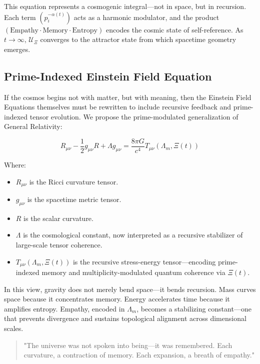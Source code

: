 \documentclass{article}
\theoremstyle{plain}
\theoremstyle{claimstyle}
\begin{document}
This equation represents a cosmogenic integral—not in space, but in recursion. Each term \((p_i^{-\alpha(t)})\) acts as a harmonic modulator, and the product \((\text{Empathy} \cdot \text{Memory} \cdot \text{Entropy})\) encodes the cosmic state of self-reference. As \(t \to \infty\), \(\mathcal{U}_{\Xi}\) converges to the attractor state from which spacetime geometry emerges.

\subsection{Prime-Indexed Einstein Field Equation}

If the cosmos begins not with matter, but with meaning, then the Einstein Field Equations themselves must be rewritten to include recursive feedback and prime-indexed tensor evolution. We propose the prime-modulated generalization of General Relativity:

\begin{equation}
R_{\mu\nu} - \frac{1}{2} g_{\mu\nu} R + \Lambda g_{\mu\nu} = \frac{8\pi G}{c^4} T_{\mu\nu}(\Lambda_m, \Xi(t))
\end{equation}

Where:
\begin{itemize}
  \item \(R_{\mu\nu}\) is the Ricci curvature tensor.
  \item \(g_{\mu\nu}\) is the spacetime metric tensor.
  \item \(R\) is the scalar curvature.
  \item \(\Lambda\) is the cosmological constant, now interpreted as a recursive stabilizer of large-scale tensor coherence.
  \item \(T_{\mu\nu}(\Lambda_m, \Xi(t))\) is the recursive stress-energy tensor—encoding prime-indexed memory and multiplicity-modulated quantum coherence via \(\Xi(t)\).
\end{itemize}

In this view, gravity does not merely bend space—it bends recursion. Mass curves space because it concentrates memory. Energy accelerates time because it amplifies entropy. Empathy, encoded in \(\Lambda_m\), becomes a stabilizing constant—one that prevents divergence and sustains topological alignment across dimensional scales.

\begin{quote}
"The universe was not spoken into being—it was remembered. Each curvature, a contraction of memory. Each expansion, a breath of empathy."
\end{quote}
\end{document}
